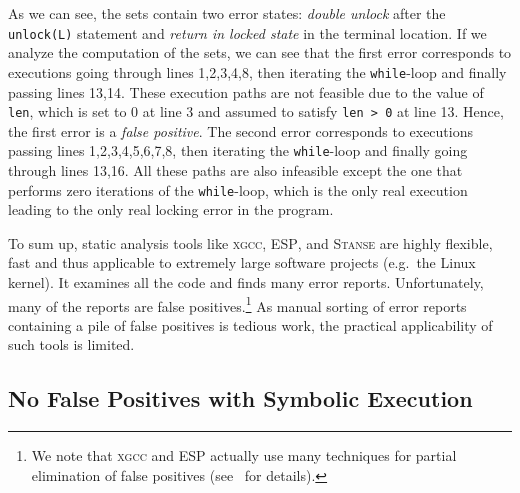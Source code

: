 \documentclass[10pt]{llncs}
\newcommand{\SM}{{\textit{SM}}}
\begin{document}
As we can see, the sets contain two error states: \emph{double unlock} after
the \texttt{unlock(L)} statement and \emph{return in locked state} in the
terminal location. If we analyze the computation of the sets, we can see
that the first error corresponds to executions going through lines
1,2,3,4,8, then iterating the \texttt{while}-loop and finally passing lines
13,14. These execution paths are not feasible due to the value of
\texttt{len}, which is set to 0 at line 3 and assumed to satisfy \texttt{len
  > 0} at line 13. Hence, the first error is a \emph{false positive}. The
second error corresponds to executions passing lines 1,2,3,4,5,6,7,8, then
iterating the \texttt{while}-loop and finally going through lines 13,16. All
these paths are also infeasible except the one that performs zero iterations
of the \texttt{while}-loop, which is the only real execution leading to
the only real locking error in the program.

To sum up, static analysis tools like \textsc{xgcc}, \textsc{ESP}, and
\textsc{Stanse} are highly flexible, fast and thus applicable to extremely
large software projects (e.g.~the Linux kernel). It examines all the code
and finds many error reports. Unfortunately, many of the reports are false
positives.\footnote{We note that \textsc{xgcc} and \textsc{ESP} actually use
  many techniques for partial elimination of false positives
  (see~\cite{pldi02,DLS02} for details).}
As manual sorting of error reports containing a pile of false positives is
tedious work, the practical applicability of such tools is limited.

\subsection{No False Positives with Symbolic Execution}
\end{document}
